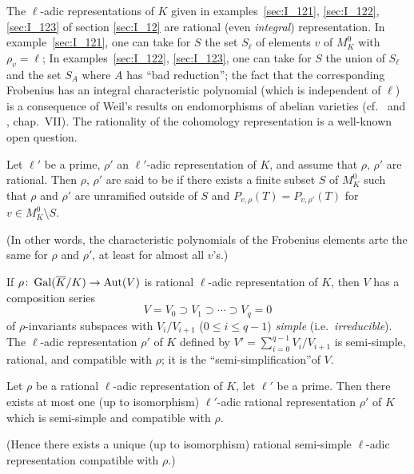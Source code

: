 \begin{ex}
The $\ell$-adic representations of $K$ given in examples~\ref{sec:I_121},
\ref{sec:I_122}, \ref{sec:I_123} of section \ref{sec:I_12} are rational (even
\emph{integral}) representation.
In example~\ref{sec:I_121}, one can take for $S$ the set $S_{\ell}$ of
elements $v$ of $M_K^0$ with $\rho_v = \ell$; In examples~\ref{sec:I_122},
\ref{sec:I_123}, one can take for $S$ the union of $S_\ell$ and the set
$S_A$ where $A$ has ``bad reduction''; the fact that the corresponding
Frobenius has an integral characteristic polynomial (which is independent of
$\ell$) is a consequence of Weil's results on endomorphisms of abelian
varieties (cf.\ \cite{40} and \cite{12}, chap.~VII).
\dpage
The rationality of the cohomology representation is a well-known open question.
\end{ex}

\begin{mydef}
Let $\ell'$ be a prime, $\rho'$ an $\ell'$-adic representation of $K$, and assume that $\rho$, $\rho'$ are rational. Then $\rho$, $\rho'$ are said to be  if there exists a finite subset $S$ of $M_K^0$ such that $\rho$ and $\rho'$ are unramified outside of $S$ and $P_{v,\rho}(T) = P_{v,\rho'}(T)$ for $v \in M_K^0 \setminus S$.
\end{mydef}
(In other words, the characteristic polynomials of the Frobenius elements arte
the same for $\rho$ and $\rho'$, at least for almost all $v$'s.)

If $\rho\colon \operatorname{Gal}(\overline{K}/K) \to \operatorname{Aut}(V)$ is rational $\ell$-adic
representation of $K$, then $V$ has a composition series
\[
	V = V_0 \supset V_1 \supset \cdots \supset V_q = 0
\]
of $\rho$-invariants subspaces with $V_i / V_{i+1}$ ($0 \leq i \leq q - 1$)
\emph{simple} (i.e.\ \emph{irreducible}). The $\ell$-adic representation
$\rho'$ of $K$ defined by $V' = \sum_{i=0}^{q-1} V_i / V_{i + 1}$ is
semi-simple, rational, and compatible with $\rho$; it is the
``semi-simplification''\break of $V$. 

\begin{thm}
Let $\rho$ be a rational $\ell$-adic representation of $K$, let $\ell'$ be a prime. Then there exists at most one (up to isomorphism) $\ell'$-adic rational representation $\rho'$ of $K$ which is semi-simple and compatible with $\rho$.
\end{thm}

(Hence there exists a unique (up to isomorphism) rational semi-simple $\ell$-adic representation compatible with $\rho$.)

